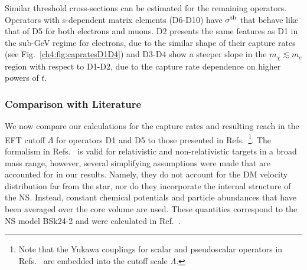 Similar threshold cross-sections can be estimated for the remaining operators.  Operators with s-dependent matrix elements (D6-D10) have  $\sigma^{\rm th}$ that behave like that of D5 for both electrons and muons. D2 presents the same features as D1 in the sub-GeV regime for electrons, due to the similar shape of their capture rates (see Fig.~\ref{ch4:fig:capratesD1D4}) and D3-D4 show a steeper slope in the $m_\chi\lesssim m_e$ region with respect to D1-D2, due to the capture rate dependence on higher powers of $t$. 



\subsubsection{Comparison with Literature}
\label{ch4:subsubsec:literature_comp_NS}

We now compare our calculations for the capture rates and resulting reach in the EFT cutoff $\Lambda$ for operators D1 and D5 to those presented in Refs.~\cite{Joglekar:2019vzy_sep_Relativisticcapturedark,Joglekar:2020liw_Darkkineticheating}\footnote{Note that the Yukawa couplings for scalar and pseudoscalar operators in Refs.~\cite{Joglekar:2019vzy_sep_Relativisticcapturedark,Joglekar:2020liw_Darkkineticheating} are embedded into the cutoff scale $\Lambda$.}.
The formalism in Refs.~\cite{Joglekar:2019vzy_sep_Relativisticcapturedark,Joglekar:2020liw_Darkkineticheating} is valid for relativistic and non-relativistic targets in a broad mass range, however, several simplifying assumptions were made that are accounted for in our results. Namely, they do not account for the DM velocity distribution far from the star, nor do they incorporate the internal structure of the NS. Instead, constant chemical potentials and particle abundances that have been averaged over the core volume are used. These quantities correspond to the NS model BSk24-2 and were calculated in Ref.~\cite{Bell:2019pyc_jun_CaptureLeptophilicDark}. 




